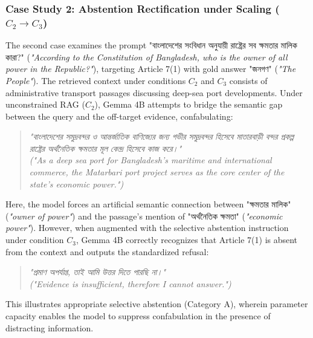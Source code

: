 \documentclass[11pt,a4paper,twocolumn]{article}
\DeclareRobustCommand{\foreignlanguage}[2]{#2}
\let\bengalifont\relax
\DeclareRobustCommand{\foreignlanguage}[2]{{\bengalifont #2}}
\DeclareRobustCommand{\foreignlanguage}[2]{#2}
\begin{document}
\subsubsection{Case Study 2: Abstention Rectification under Scaling ($C_2 \rightarrow C_3$)}
The second case examines the prompt \foreignlanguage{bengali}{"বাংলাদেশের সংবিধান অনুযায়ী রাষ্ট্রের সব ক্ষমতার মালিক কারা?"} (\emph{"According to the Constitution of Bangladesh, who is the owner of all power in the Republic?"}), targeting Article 7(1) with gold answer \foreignlanguage{bengali}{"জনগণ"} (\emph{"The People"}). The retrieved context under conditions $C_2$ and $C_3$ consists of administrative transport passages discussing deep-sea port developments. Under unconstrained RAG ($C_2$), Gemma 4B attempts to bridge the semantic gap between the query and the off-target evidence, confabulating:
\begin{quote}
    \foreignlanguage{bengali}{\emph{"বাংলাদেশের সমুদ্রবন্দর ও আন্তর্জাতিক বাণিজ্যের জন্য গভীর সমুদ্রবন্দর হিসেবে মাতারবাড়ী বন্দর প্রকল্প রাষ্ট্রের অর্থনৈতিক ক্ষমতার মূল কেন্দ্র হিসেবে কাজ করে।"}} \\
    \emph{("As a deep sea port for Bangladesh's maritime and international commerce, the Matarbari port project serves as the core center of the state's economic power.")}
\end{quote}
Here, the model forces an artificial semantic connection between \foreignlanguage{bengali}{"ক্ষমতার মালিক"} (\emph{"owner of power"}) and the passage's mention of \foreignlanguage{bengali}{"অর্থনৈতিক ক্ষমতা"} (\emph{"economic power"}). However, when augmented with the selective abstention instruction under condition $C_3$, Gemma 4B correctly recognizes that Article 7(1) is absent from the context and outputs the standardized refusal:
\begin{quote}
    \foreignlanguage{bengali}{\emph{"প্রমাণ অপর্যাপ্ত, তাই আমি উত্তর দিতে পারছি না।"}} \\
    \emph{("Evidence is insufficient, therefore I cannot answer.")}
\end{quote}
This illustrates appropriate selective abstention (Category A), wherein parameter capacity enables the model to suppress confabulation in the presence of distracting information.
\end{document}
